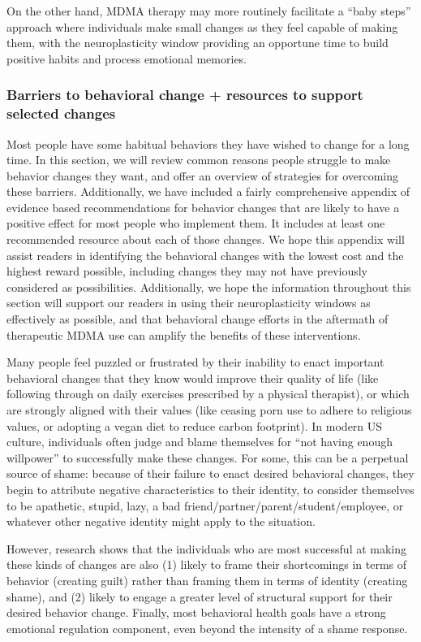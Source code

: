 \documentclass[12pt,letterpaper]{article}
\begin{document}
On the other hand, MDMA therapy may more routinely facilitate a “baby steps” approach where individuals make small changes as they feel capable of making them, with the neuroplasticity window providing an opportune time to build positive habits and process emotional memories.

\subsubsection*{Barriers to behavioral change + resources to support selected changes}

Most people have some habitual behaviors they have wished to change for a long time. In this section, we will review common reasons people struggle to make behavior changes they want, and offer an overview of strategies for overcoming these barriers. Additionally, we have included a fairly comprehensive appendix of evidence based recommendations for behavior changes that are likely to have a positive effect for most people who implement them. It includes at least one recommended resource about each of those changes. We hope this appendix will assist readers in identifying the behavioral changes with the lowest cost and the highest reward possible, including changes they may not have previously considered as possibilities. Additionally, we hope the information throughout this section will support our readers in using their neuroplasticity windows as effectively as possible, and that behavioral change efforts in the aftermath of therapeutic MDMA use can amplify the benefits of these interventions.

Many people feel puzzled or frustrated by their inability to enact important behavioral changes that they know would improve their quality of life (like following through on daily exercises prescribed by a physical therapist), or which are strongly aligned with their values (like ceasing porn use to adhere to religious values, or adopting a vegan diet to reduce carbon footprint). In modern US culture, individuals often judge and blame themselves for “not having enough willpower” to successfully make these changes. For some, this can be a perpetual source of shame: because of their failure to enact desired behavioral changes, they begin to attribute negative characteristics to their identity, to consider themselves to be apathetic, stupid, lazy, a bad friend/partner/parent/student/employee, or whatever other negative identity might apply to the situation.

However, research shows that the individuals who are most successful at making these kinds of changes are also (1) likely to frame their shortcomings in terms of behavior (creating guilt) rather than framing them in terms of identity (creating shame), and (2) likely to engage a greater level of structural support for their desired behavior change. Finally, most behavioral health goals have a strong emotional regulation component, even beyond the intensity of a shame response.
\end{document}
